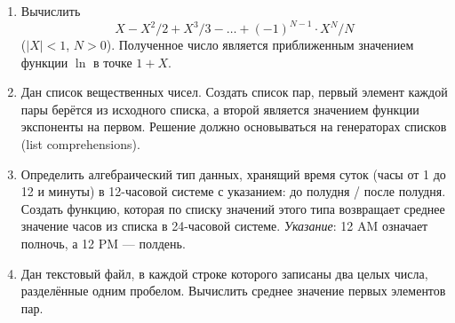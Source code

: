\begin{enumerate}
    \itemsep=\myitemsep
    \item Вычислить
        \[ X - X^2/2 + X^3/3 - \ldots + (-1)^{N-1} \cdot X^N/N \]
    ($|X| < 1$, $N > 0$). Полученное число является приближенным значением функции
    $\ln$ в точке $1 + X$.
    
    \item Дан список вещественных чисел. Создать список пар, первый элемент
    каждой пары берётся из исходного списка, а второй является значением функции
    экспоненты на первом. Решение должно основываться на генераторах
    списков (list comprehensions).

    \item Определить алгебраический тип данных, хранящий время суток (часы от 1 до 12
    и минуты) в 12-часовой системе с указанием: до полудня / после полудня.
    Создать функцию, которая по списку значений этого типа возвращает
    среднее значение часов из списка в 24-часовой системе. \emph{Указание}: 12 AM означает
    полночь, а 12 PM — полдень.

    \item Дан текстовый файл, в каждой строке которого записаны два целых числа,
    разделённые одним пробелом. Вычислить среднее значение первых элементов пар.
\end{enumerate}